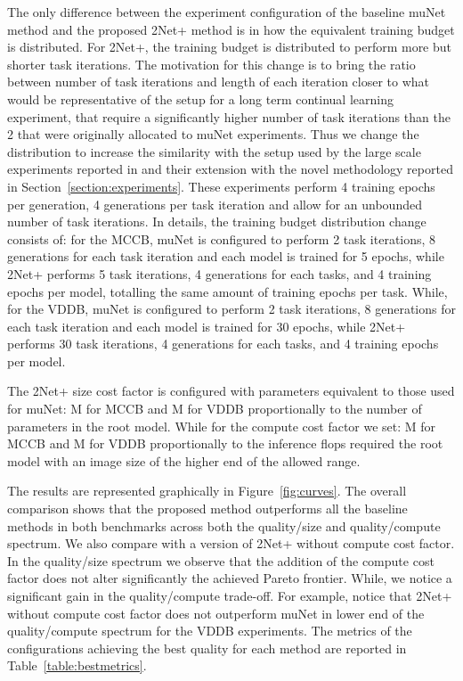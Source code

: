 \documentclass{article} \usepackage{iclr2023_conference,times}
\newcommand{\method}{2Net+\xspace}
\begin{document}
The only difference between the experiment configuration of the baseline muNet method and the proposed \method method is in how the equivalent training budget is distributed.
For \method, the training budget is distributed to perform more but shorter task iterations.
The motivation for this change is to bring the ratio between number of task iterations and length of each iteration closer to what would be representative of the setup for a long term continual learning experiment, that require a significantly higher number of task iterations than the 2 that were originally allocated to muNet experiments.
Thus we change the distribution to increase the similarity with the setup used by the large scale experiments reported in \cite{Gesmundo2022munet2} and their extension with the novel methodology reported in Section~\ref{section:experiments}.
These experiments perform 4 training epochs per generation, 4 generations per task iteration and allow for an unbounded number of task iterations.
In details, the training budget distribution change consists of: for the MCCB, muNet is configured to perform 2 task iterations, 8 generations for each task iteration and each model is trained for 5 epochs, while \method performs 5 task iterations, 4 generations for each tasks, and 4 training epochs per model, totalling the same amount of training epochs per task.
While, for the VDDB, muNet is configured to perform 2 task iterations, 8 generations for each task iteration and each model is trained for 30 epochs, while \method performs 30 task iterations, 4 generations for each tasks, and 4 training epochs per model.

The \method size cost factor is configured with parameters equivalent to those used for muNet: M for MCCB and M for VDDB proportionally to the number of parameters in the root model.
While for the compute cost factor we set: M for MCCB and M for VDDB proportionally to the inference flops required the root model with an image size of the higher end of the allowed range.

The results are represented graphically in Figure~\ref{fig:curves}.
The overall comparison shows that the proposed method outperforms all the baseline methods in both benchmarks across both the quality/size and quality/compute spectrum.
We also compare with a version of \method without compute cost factor.
In the quality/size spectrum we observe that the addition of the compute cost factor does not alter significantly the achieved Pareto frontier.
While, we notice a significant gain in the quality/compute trade-off.
For example, notice that \method without compute cost factor does not outperform muNet in lower end of the quality/compute spectrum for the VDDB experiments.
The metrics of the configurations achieving the best quality for each method are reported in Table~\ref{table:bestmetrics}.
\end{document}
